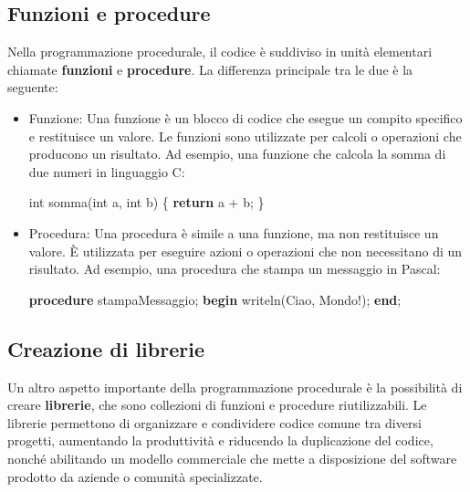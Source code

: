 \documentclass[
  letterpaper,
]{scrbook}
\newenvironment{Shaded}{\begin{snugshade}}{\end{snugshade}}
\newcommand{\ControlFlowTok}[1]{\textcolor[rgb]{0.00,0.23,0.31}{\textbf{#1}}}
\newcommand{\DataTypeTok}[1]{\textcolor[rgb]{0.68,0.00,0.00}{#1}}
\newcommand{\KeywordTok}[1]{\textcolor[rgb]{0.00,0.23,0.31}{\textbf{#1}}}
\newcommand{\NormalTok}[1]{\textcolor[rgb]{0.00,0.23,0.31}{#1}}
\newcommand{\OperatorTok}[1]{\textcolor[rgb]{0.37,0.37,0.37}{#1}}
\newcommand{\StringTok}[1]{\textcolor[rgb]{0.13,0.47,0.30}{#1}}
\begin{document}
\subsection{Funzioni e procedure}\label{funzioni-e-procedure}

Nella programmazione procedurale, il codice è suddiviso in unità
elementari chiamate \textbf{funzioni} e \textbf{procedure}. La
differenza principale tra le due è la seguente:

\begin{itemize}
\item
  Funzione: Una funzione è un blocco di codice che esegue un compito
  specifico e restituisce un valore. Le funzioni sono utilizzate per
  calcoli o operazioni che producono un risultato. Ad esempio, una
  funzione che calcola la somma di due numeri in linguaggio C:

\begin{Shaded}
\begin{Highlighting}[]
\DataTypeTok{int}\NormalTok{ somma}\OperatorTok{(}\DataTypeTok{int}\NormalTok{ a}\OperatorTok{,} \DataTypeTok{int}\NormalTok{ b}\OperatorTok{)} \OperatorTok{\{}
  \ControlFlowTok{return}\NormalTok{ a }\OperatorTok{+}\NormalTok{ b}\OperatorTok{;}
\OperatorTok{\}}
\end{Highlighting}
\end{Shaded}
\item
  Procedura: Una procedura è simile a una funzione, ma non restituisce
  un valore. È utilizzata per eseguire azioni o operazioni che non
  necessitano di un risultato. Ad esempio, una procedura che stampa un
  messaggio in Pascal:

\begin{Shaded}
\begin{Highlighting}[]
\KeywordTok{procedure}\NormalTok{ stampaMessaggio;}
\KeywordTok{begin}
\NormalTok{  writeln(}\StringTok{\textquotesingle{}Ciao, Mondo!\textquotesingle{}}\NormalTok{);}
\KeywordTok{end}\NormalTok{;}
\end{Highlighting}
\end{Shaded}
\end{itemize}

\subsection{Creazione di librerie}\label{creazione-di-librerie}

Un altro aspetto importante della programmazione procedurale è la
possibilità di creare \textbf{librerie}, che sono collezioni di funzioni
e procedure riutilizzabili. Le librerie permettono di organizzare e
condividere codice comune tra diversi progetti, aumentando la
produttività e riducendo la duplicazione del codice, nonché abilitando
un modello commerciale che mette a disposizione del software prodotto da
aziende o comunità specializzate.
\end{document}
